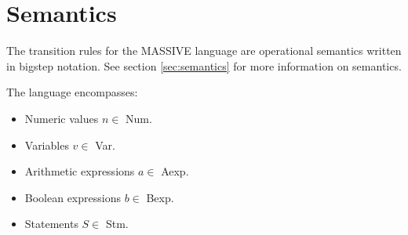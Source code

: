\section{Semantics}
The transition rules for the MASSIVE language are operational semantics written in bigstep notation. 
See section \ref{sec:semantics} for more information on semantics. \newline

The language encompasses:
\begin{itemize}
\item Numeric values $n \in$ Num.
\item Variables $v \in$ Var.
\item Arithmetic expressions $a \in$ Aexp.
\item Boolean expressions $b \in$ Bexp.
\item Statements $S \in$ Stm.
\end{itemize}

